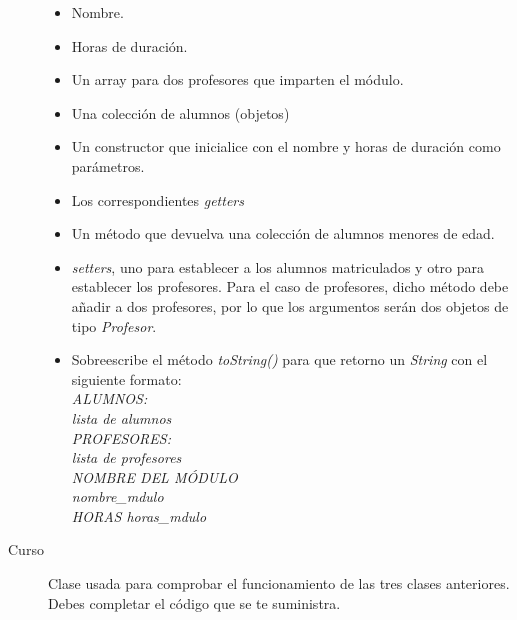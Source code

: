 \documentclass[addpoints,12pt]{exam}
\begin{document}
\begin{questions}
\begin{description}
\begin{itemize}
\item Nombre.
\item Horas de duración. 
\item Un array para dos profesores que imparten el módulo.
\item Una colección de alumnos (objetos)
\item Un constructor que inicialice con el nombre y horas de duración como parámetros.
\item Los correspondientes \emph{getters}
\item Un método que devuelva una colección de alumnos menores de edad.
\item \emph{setters},  uno para establecer a los alumnos matriculados y otro para establecer los profesores. Para el caso de profesores, dicho método debe añadir a dos profesores, por lo que los argumentos serán dos objetos de tipo \emph{Profesor}.
\item Sobreescribe el método \emph{toString()} para que retorno un \emph{String} con el siguiente formato:\\
\emph{ALUMNOS:\\
lista de alumnos \\
PROFESORES:\\
lista de profesores\\
NOMBRE DEL MÓDULO\\
nombre\_mdulo\\
HORAS
horas\_mdulo}
\end{itemize}
\item[Curso] Clase usada para comprobar el funcionamiento de las tres clases anteriores. 
Debes completar el código que se te suministra.
\end{description}


\end{questions}
\end{document}

